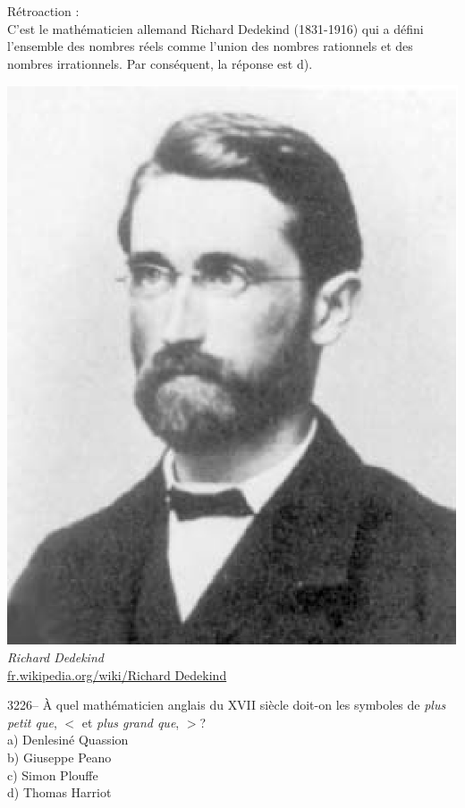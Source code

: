 \documentclass[letterpaper, 12pt]{article}
\begin{document}
R\'etroaction :\\
C'est le math\'ematicien allemand Richard Dedekind (1831-1916) qui a d\'efini l'ensemble des nombres r\'eels comme l'union des nombres rationnels et des nombres irrationnels. Par cons\'equent, la r\'eponse est d).
\begin{center}
\includegraphics[scale=0.3]{Dedekind.eps}\\
\emph{{\small Richard Dedekind}}\\
\href{http://fr.wikipedia.org/wiki/Richard_Dedekind}{fr.wikipedia.org/wiki/Richard Dedekind}\\[5mm]
\end{center}



3226-- \`A quel math\'ematicien anglais du {\scriptsize XVII\ieme{}} si\`ecle doit-on les symboles de \emph{plus petit que}, $<$ et \emph{plus grand que}, $>$?\\

a) Denlesin\'e Quassion\\
b) Giuseppe Peano\\
c) Simon Plouffe\\
d) Thomas Harriot\\
\end{document}
